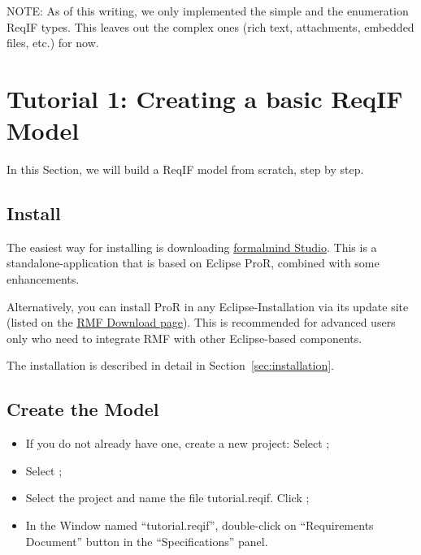 NOTE: As of this writing, we only implemented the simple and the enumeration ReqIF types.  This leaves out the complex ones (rich text, attachments, embedded files, etc.) for now.

\section{Tutorial 1: Creating a basic ReqIF Model}

In this Section, we will build a ReqIF model from scratch, step by step.

\subsection{Install \pror{}}

The easiest way for installing \pror{} is downloading \href{http://formalmind.com/studio}{formalmind Studio}.  This is a standalone-application that is based on Eclipse ProR, combined with some enhancements.

 Alternatively, you can install ProR in any Eclipse-Installation via its update site (listed on the \href{https://www.eclipse.org/rmf/download.php}{RMF Download page}).  This is recommended for advanced users only who need to integrate RMF with other Eclipse-based components.

\begin{info}
The installation is described in detail in Section~\ref{sec:installation}.
\end{info}

\subsection{Create the Model}

\begin{itemize}

\item
  If you do not already have one, create a new project: Select  ;
\item
  Select ;
\item
  Select the project and name the file tutorial.reqif.  Click ;
\item
  In the Window named ``tutorial.reqif'', double-click on ``Requirements
  Document'' button in the ``Specifications'' panel.
\end{itemize}

